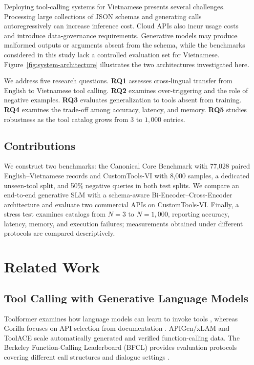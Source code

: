 \documentclass[10pt,twocolumn,a4paper]{article}
\begin{document}
Deploying tool-calling systems for Vietnamese presents several challenges. Processing large collections of JSON schemas and generating calls autoregressively can increase inference cost. Cloud APIs also incur usage costs and introduce data-governance requirements. Generative models may produce malformed outputs or arguments absent from the schema, while the benchmarks considered in this study lack a controlled evaluation set for Vietnamese. Figure~\ref{fig:system-architecture} illustrates the two architectures investigated here.

We address five research questions. \textbf{RQ1} assesses cross-lingual transfer from English to Vietnamese tool calling. \textbf{RQ2} examines over-triggering and the role of negative examples. \textbf{RQ3} evaluates generalization to tools absent from training. \textbf{RQ4} examines the trade-off among accuracy, latency, and memory. \textbf{RQ5} studies robustness as the tool catalog grows from $3$ to $1{,}000$ entries.

\subsection{Contributions}
We construct two benchmarks: the Canonical Core Benchmark with 77,028 paired English--Vietnamese records and CustomTools-VI with 8,000 samples, a dedicated unseen-tool split, and 50\% negative queries in both test splits. We compare an end-to-end generative SLM with a schema-aware Bi-Encoder--Cross-Encoder architecture and evaluate two commercial APIs on CustomTools-VI. Finally, a stress test examines catalogs from $N=3$ to $N=1{,}000$, reporting accuracy, latency, memory, and execution failures; measurements obtained under different protocols are compared descriptively.

\section{Related Work}

\subsection{Tool Calling with Generative Language Models}
Toolformer examines how language models can learn to invoke tools \cite{schick2023toolformer}, whereas Gorilla focuses on API selection from documentation \cite{patil2023gorilla}. APIGen/xLAM \cite{liu2024apigen} and ToolACE \cite{liu2024toolace} scale automatically generated and verified function-calling data. The Berkeley Function-Calling Leaderboard (BFCL) provides evaluation protocols covering different call structures and dialogue settings \cite{yan2024bfcl}.
\end{document}
